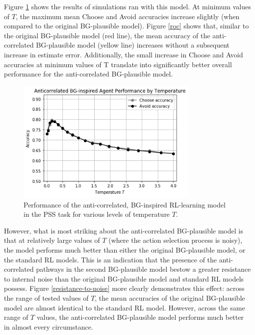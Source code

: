 \documentclass[10pt,letterpaper]{article}
\begin{document}
Figure \ref{bg-anti-agent} shows the results of simulations ran with this model. At minimum values of $T$, the maximum mean Choose and Avoid accuracies increase slightly (when compared to the original BG-plausible model). Figure \ref{roc} shows that, similar to the original BG-plausible model (red line), the mean accuracy of the anti-correlated BG-plausible model (yellow line) increases without a subsequent increase in estimate error. Additionally, the small increase in Choose and Avoid accuracies at minimum values of T translate into significantly better overall performance for the anti-correlated BG-plausible model. 

\begin{figure}[ht]
	\begin{center}
		\includegraphics[width=3.5in]{bg-anti-agent-performance.png}
	\end{center}
	\caption{Performance of the anti-correlated, BG-inspired RL-learning model in the PSS task for various levels of temperature $T$.}
	\label{bg-anti-agent}
\end{figure}

However, what is most striking about the anti-correlated BG-plausible model is that at relatively large values of $T$ (where the action selection process is noisy), the model performs much better than either the original BG-plausible model, or the standard RL models. This is an indication that the presence of the anti-correlated pathways in the second BG-plausible model bestow a greater resistance to internal noise than the original BG-plausible model and standard RL models possess. Figure \ref{resistance-to-noise} more clearly demonstrates this effect: across the range of tested values of $T$, the mean accuracies of the original BG-plausible model are almost identical to the standard RL model. However, across the same range of $T$ values, the anti-correlated BG-plausible model performs much better in almost every circumstance.
\end{document}
